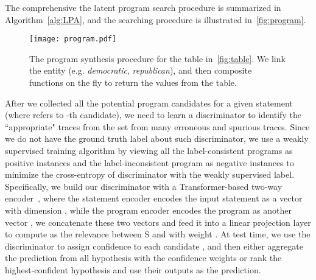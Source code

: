 \documentclass{article} \usepackage{iclr2020_conference,times}
\begin{document}
The comprehensive the latent program search procedure is summarized in Algorithm~\ref{alg:LPA}, and  the searching procedure is illustrated in~\autoref{fig:program}. 
\begin{figure*}[thb]
    \centering
    \texttt{[image: program.pdf]}
    \caption{The program  synthesis procedure for the table in~\autoref{fig:table}. We link the entity (e.g. \textit{democratic}, \textit{republican}), and then composite functions on the fly to return the values from the table.}
    \vspace{-3ex}
    \label{fig:program}
\end{figure*}

After we collected all the potential program candidates  for a given statement  (where  refers to -th candidate), we need to learn a discriminator to identify the ``appropriate" traces from the set from many erroneous and spurious traces. Since we do not have the ground truth label about such discriminator, we use a weakly supervised training algorithm by viewing all the label-consistent programs as positive instances   and the label-inconsistent program as negative instances  to minimize the cross-entropy of discriminator  with the weakly supervised label.  Specifically, we build our discriminator with a Transformer-based two-way encoder~\citep{vaswani2017attention}, where the statement encoder encodes the input statement  as a vector  with dimension , while the program encoder encodes the program  as another vector , we concatenate these two vectors and feed it into a linear projection layer to compute  as the relevance between S and  with weight . At test time, we use the discriminator  to assign confidence  to each candidate , and then either aggregate the prediction from all hypothesis with the confidence weights or rank the highest-confident hypothesis and use their outputs as the prediction. 
\end{document}
